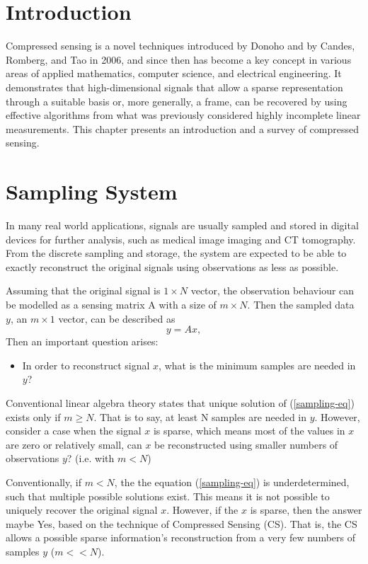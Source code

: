 \section{Introduction}

Compressed sensing is a novel techniques introduced by Donoho \cite{donoho2006sparse} and by Candes, Romberg, and Tao \cite{candes2006robust} in 2006, and since then has become a key concept in various areas of applied mathematics, computer science, and electrical engineering. It demonstrates that high-dimensional signals that allow a sparse representation through  a suitable basis or, more generally, a frame, can be recovered by using effective algorithms from what was previously considered
highly incomplete linear measurements. This chapter presents
an introduction and a survey of compressed sensing.

\section{Sampling System}

In many real world applications, signals are usually sampled and stored in digital devices for further analysis, such as medical image imaging and CT tomography. From the discrete sampling and storage, the system are expected to be able to exactly reconstruct the original signals using observations as less as possible. 

Assuming that the original signal is $1 \times N$ vector, the observation behaviour can be modelled as a sensing matrix A with a size of $m \times N$. Then the sampled data $y$, an $m \times 1$ vector, can be described as
\begin{equation}
\label{sampling-eq}
y = Ax,
\end{equation}
Then an important question arises:
\begin{itemize}
\item 
In order to reconstruct signal $x$, what is the minimum samples are needed in $y$?
\end{itemize}

Conventional linear algebra theory states that unique solution of (\ref{sampling-eq}) exists only if $m \geq N$. That is to say, at least N samples are needed in $y$. However, consider a case when the signal $x$ is sparse, which means most of the values in $x$ are zero or relatively small, can $x$ be reconstructed using smaller numbers of observations $y$? (i.e. with $m < N$)

Conventionally, if $m < N$, the the equation (\ref{sampling-eq}) is underdetermined, such that multiple possible solutions exist. This means it is not possible to uniquely recover the original signal $x$. 
However, if the $x$ is sparse, then the answer maybe Yes, based on the technique of Compressed Sensing (CS). That is, the CS allows a possible sparse information’s reconstruction from a very few
numbers of samples $y$ ($m << N$).

